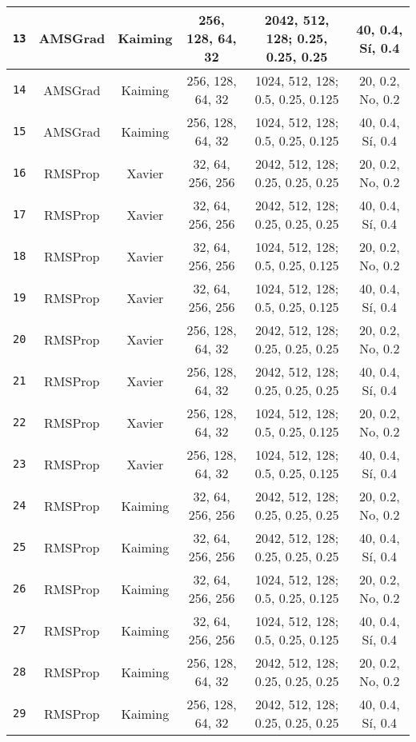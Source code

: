 \begin{table}[h]
{\begin{tabular}{|c|c|c|c|c|c|}
\lstinline!13! & AMSGrad & Kaiming & 256, 128, 64, 32 & 2042, 512, 128; 0.25, 0.25, 0.25 & 40, 0.4, Sí, 0.4 \\ \hline
\lstinline!14! & AMSGrad & Kaiming & 256, 128, 64, 32 & 1024, 512, 128; 0.5, 0.25, 0.125 & 20, 0.2, No, 0.2 \\ \hline
\lstinline!15! & AMSGrad & Kaiming & 256, 128, 64, 32 & 1024, 512, 128; 0.5, 0.25, 0.125 & 40, 0.4, Sí, 0.4 \\ \hline
\rowcolor[HTML]{32CB00} 
\lstinline!16! & RMSProp & Xavier & 32, 64, 256, 256 & 2042, 512, 128; 0.25, 0.25, 0.25 & 20, 0.2, No, 0.2 \\ \hline
\lstinline!17! & RMSProp & Xavier & 32, 64, 256, 256 & 2042, 512, 128; 0.25, 0.25, 0.25 & 40, 0.4, Sí, 0.4 \\ \hline
\lstinline!18! & RMSProp & Xavier & 32, 64, 256, 256 & 1024, 512, 128; 0.5, 0.25, 0.125 & 20, 0.2, No, 0.2 \\ \hline
\lstinline!19! & RMSProp & Xavier & 32, 64, 256, 256 & 1024, 512, 128; 0.5, 0.25, 0.125 & 40, 0.4, Sí, 0.4 \\ \hline
\lstinline!20! & RMSProp & Xavier & 256, 128, 64, 32 & 2042, 512, 128; 0.25, 0.25, 0.25 & 20, 0.2, No, 0.2 \\ \hline
\lstinline!21! & RMSProp & Xavier & 256, 128, 64, 32 & 2042, 512, 128; 0.25, 0.25, 0.25 & 40, 0.4, Sí, 0.4 \\ \hline
\lstinline!22! & RMSProp & Xavier & 256, 128, 64, 32 & 1024, 512, 128; 0.5, 0.25, 0.125 & 20, 0.2, No, 0.2 \\ \hline
\lstinline!23! & RMSProp & Xavier & 256, 128, 64, 32 & 1024, 512, 128; 0.5, 0.25, 0.125 & 40, 0.4, Sí, 0.4 \\ \hline
\lstinline!24! & RMSProp & Kaiming & 32, 64, 256, 256 & 2042, 512, 128; 0.25, 0.25, 0.25 & 20, 0.2, No, 0.2 \\ \hline
\rowcolor[HTML]{32CB00} 
\lstinline!25! & RMSProp & Kaiming & 32, 64, 256, 256 & 2042, 512, 128; 0.25, 0.25, 0.25 & 40, 0.4, Sí, 0.4 \\ \hline
\lstinline!26! & RMSProp & Kaiming & 32, 64, 256, 256 & 1024, 512, 128; 0.5, 0.25, 0.125 & 20, 0.2, No, 0.2 \\ \hline
\lstinline!27! & RMSProp & Kaiming & 32, 64, 256, 256 & 1024, 512, 128; 0.5, 0.25, 0.125 & 40, 0.4, Sí, 0.4 \\ \hline
\lstinline!28! & RMSProp & Kaiming & 256, 128, 64, 32 & 2042, 512, 128; 0.25, 0.25, 0.25 & 20, 0.2, No, 0.2 \\ \hline
\lstinline!29! & RMSProp & Kaiming & 256, 128, 64, 32 & 2042, 512, 128; 0.25, 0.25, 0.25 & 40, 0.4, Sí, 0.4 \\ \hline

\end{tabular}}
\end{table}
